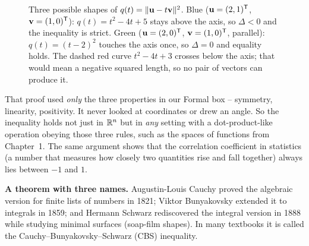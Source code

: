 \begin{figure}[htbp]
\centering
{}
\caption{Three possible shapes of $q(t)=\lVert\mathbf{u}-t\mathbf{v}\rVert^2$. Blue
($\mathbf{u}=(2,1)^{\mathsf{T}}$, $\mathbf{v}=(1,0)^{\mathsf{T}}$): $q(t)=t^2-4t+5$ stays above the axis, so
$\Delta<0$ and the inequality is strict. Green ($\mathbf{u}=(2,0)^{\mathsf{T}}$,
$\mathbf{v}=(1,0)^{\mathsf{T}}$, parallel): $q(t)=(t-2)^2$ touches the axis once, so $\Delta=0$
and equality holds. The dashed red curve $t^2-4t+3$ crosses below the axis; that
would mean a negative squared length, so no pair of vectors can produce it.}
\label{ch04:cs-parabola}
\end{figure}

\begin{aestheticbox}
That proof used \emph{only} the three properties in our Formal box -- symmetry,
linearity, positivity. It never looked at coordinates or drew an angle. So the
inequality holds not just in $\mathbb{R}^n$ but in \emph{any} setting with a
dot-product-like operation obeying those three rules, such as the spaces of
functions from Chapter~1. The same argument shows that the correlation coefficient
in statistics (a number that measures how closely two quantities rise and fall
together) always lies between $-1$ and $1$.
\end{aestheticbox}

\begin{marginnotebox}
\textbf{A theorem with three names.} Augustin-Louis Cauchy proved the algebraic
version for finite lists of numbers in 1821; Viktor Bunyakovsky extended it to
integrals in 1859; and Hermann Schwarz rediscovered the integral version in 1888
while studying minimal surfaces (soap-film shapes). In many textbooks it is
called the Cauchy--Bunyakovsky--Schwarz (CBS) inequality.
\end{marginnotebox}

